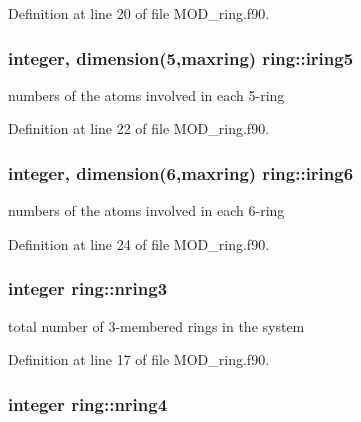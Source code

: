 Definition at line 20 of file M\-O\-D\-\_\-ring.\-f90.

\hypertarget{classring_a7324a91fac3f235d56c25c2c6fb6cfbf}{
\subsubsection[{iring5}]{\setlength{\rightskip}{0pt plus 5cm}integer, dimension(5,maxring) ring\-::iring5}}\label{classring_a7324a91fac3f235d56c25c2c6fb6cfbf}


numbers of the atoms involved in each 5-\/ring 



Definition at line 22 of file M\-O\-D\-\_\-ring.\-f90.

\hypertarget{classring_a1219a998acdcec6146da29df5c2c11e3}{
\subsubsection[{iring6}]{\setlength{\rightskip}{0pt plus 5cm}integer, dimension(6,maxring) ring\-::iring6}}\label{classring_a1219a998acdcec6146da29df5c2c11e3}


numbers of the atoms involved in each 6-\/ring 



Definition at line 24 of file M\-O\-D\-\_\-ring.\-f90.

\hypertarget{classring_a7245188aa815fe6def787091f64f6340}{
\subsubsection[{nring3}]{\setlength{\rightskip}{0pt plus 5cm}integer ring\-::nring3}}\label{classring_a7245188aa815fe6def787091f64f6340}


total number of 3-\/membered rings in the system 



Definition at line 17 of file M\-O\-D\-\_\-ring.\-f90.

\hypertarget{classring_a1e9dde7721a62bc71ba89c0f2a05ce17}{
\subsubsection[{nring4}]{\setlength{\rightskip}{0pt plus 5cm}integer ring\-::nring4}}\label{classring_a1e9dde7721a62bc71ba89c0f2a05ce17}


